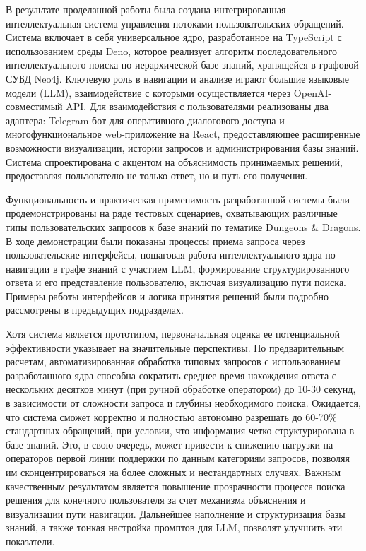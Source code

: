 В результате проделанной работы была создана интегрированная интеллектуальная система управления потоками пользовательских обращений. Система включает в себя универсальное ядро, разработанное на TypeScript с использованием среды Deno, которое реализует алгоритм последовательного интеллектуального поиска по иерархической базе знаний, хранящейся в графовой СУБД Neo4j. Ключевую роль в навигации и анализе играют большие языковые модели (LLM), взаимодействие с которыми осуществляется через OpenAI-совместимый API. Для взаимодействия с пользователями реализованы два адаптера: Telegram-бот для оперативного диалогового доступа и многофункциональное web-приложение на React, предоставляющее расширенные возможности визуализации, истории запросов и администрирования базы знаний. Система спроектирована с акцентом на объяснимость принимаемых решений, предоставляя пользователю не только ответ, но и путь его получения.

Функциональность и практическая применимость разработанной системы были продемонстрированы на ряде тестовых сценариев, охватывающих различные типы пользовательских запросов к базе знаний по тематике Dungeons \& Dragons. В ходе демонстрации были показаны процессы приема запроса через пользовательские интерфейсы, пошаговая работа интеллектуального ядра по навигации в графе знаний с участием LLM, формирование структурированного ответа и его представление пользователю, включая визуализацию пути поиска. Примеры работы интерфейсов и логика принятия решений были подробно рассмотрены в предыдущих подразделах.

Хотя система является прототипом, первоначальная оценка ее потенциальной эффективности указывает на значительные перспективы. По предварительным расчетам, автоматизированная обработка типовых запросов с использованием разработанного ядра способна сократить среднее время нахождения ответа с нескольких десятков минут (при ручной обработке оператором) до 10-30 секунд, в зависимости от сложности запроса и глубины необходимого поиска. Ожидается, что система сможет корректно и полностью автономно разрешать до 60-70\% стандартных обращений, при условии, что информация четко структурирована в базе знаний. Это, в свою очередь, может привести к снижению нагрузки на операторов первой линии поддержки по данным категориям запросов, позволяя им сконцентрироваться на более сложных и нестандартных случаях. Важным качественным результатом является повышение прозрачности процесса поиска решения для конечного пользователя за счет механизма объяснения и визуализации пути навигации. Дальнейшее наполнение и структуризация базы знаний, а также тонкая настройка промптов для LLM, позволят улучшить эти показатели.

